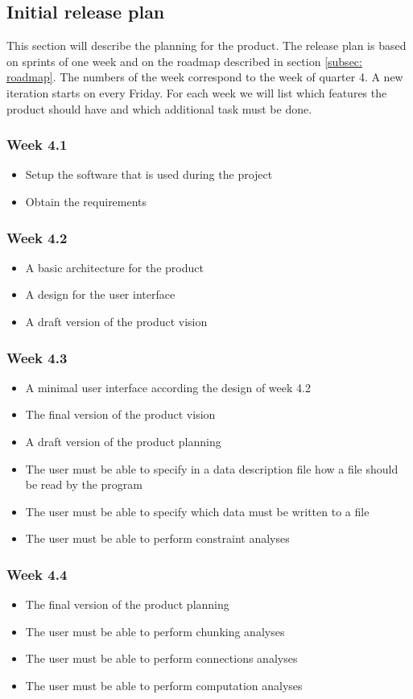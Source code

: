 \subsection{Initial release plan}
\label{subsec: release-plan}
This section will describe the planning for the product. The release plan is based on sprints of one week and on the roadmap described in section \ref{subsec: roadmap}. The numbers of the week correspond to the week of quarter 4. A new iteration starts on every Friday. For each week we will list which features the product should have and which additional task must be done.
\subsubsection{Week 4.1}
\begin{itemize}
	\item Setup the software that is used during the project
	\item Obtain the requirements
\end{itemize}

\subsubsection{Week 4.2}
\begin{itemize}
\item A basic architecture for the product
\item A design for the user interface
\item A draft version of the product vision
\end{itemize}
\subsubsection{Week 4.3}
\begin{itemize}
	\item A minimal user interface according the design of week 4.2
	\item The final version of the product vision
	\item A draft version of the product planning
	\item The user must be able to specify in a data description file how a file should be read by the program
	\item The user must be able to specify which data must be written to a file
	\item The user must be able to perform constraint analyses
\end{itemize}
\subsubsection{Week 4.4}
\begin{itemize}
	\item The final version of the product planning
	\item The user must be able to perform chunking analyses
	\item The user must be able to perform connections analyses
	\item The user must be able to perform computation analyses
\end{itemize}
